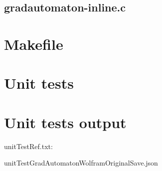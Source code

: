 \begin{scriptsize}
\begin{ttfamily}

\end{ttfamily}
\end{scriptsize}

\subsection{gradautomaton-inline.c}

\begin{scriptsize}
\begin{ttfamily}

\end{ttfamily}
\end{scriptsize}

\section{Makefile}

\begin{scriptsize}
\begin{ttfamily}

\end{ttfamily}
\end{scriptsize}

\section{Unit tests}

\begin{scriptsize}
\begin{ttfamily}

\end{ttfamily}
\end{scriptsize}

\section{Unit tests output}

unitTestRef.txt:
\begin{scriptsize}
\begin{ttfamily}

\end{ttfamily}
\end{scriptsize}

unitTestGradAutomatonWolframOriginalSave.json
\begin{scriptsize}
\begin{ttfamily}

\end{ttfamily}
\end{scriptsize}

